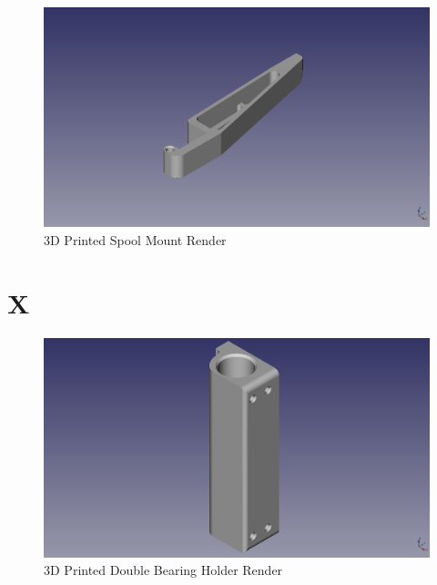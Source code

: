 \begin{figure}[H]
\centering
\includegraphics[keepaspectratio=true,angle=0,height=1.0\textheight,width=1.0\textwidth]{STL/spoolmount.stl.png}
\caption{3D Printed Spool Mount Render}
\label{fig:spoolmountrender}
\end{figure}

\section{X}

\begin{figure}[H]
\centering
\includegraphics[keepaspectratio=true,angle=0,height=1.0\textheight,width=1.0\textwidth]{STL/doublebearingholder.stl.png}
\caption{3D Printed Double Bearing Holder Render}
\label{fig:doublebearingholderrender}
\end{figure}

